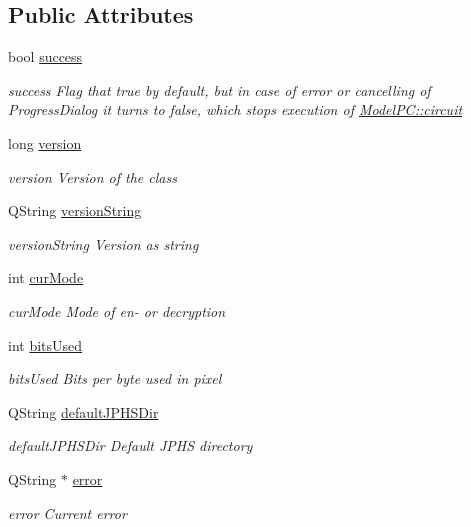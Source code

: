 \subsection*{Public Attributes}
\begin{DoxyCompactItemize}
\item 
bool \mbox{\hyperlink{class_model_p_c_a945ffbbc44a832b953c191debd448f4c}{success}}
\begin{DoxyCompactList}\small\item\em success Flag that true by default, but in case of error or cancelling of Progress\+Dialog it turns to false, which stops execution of \mbox{\hyperlink{class_model_p_c_a1d0091062a0c836b283ec2f67411623b}{Model\+P\+C\+::circuit}} \end{DoxyCompactList}\item 
long \mbox{\hyperlink{class_model_p_c_a5af48ab89e19be42a94c34ba00249401}{version}}
\begin{DoxyCompactList}\small\item\em version Version of the class \end{DoxyCompactList}\item 
Q\+String \mbox{\hyperlink{class_model_p_c_a5f426725ccf7eefd3c77ea8c720264c9}{version\+String}}
\begin{DoxyCompactList}\small\item\em version\+String Version as string \end{DoxyCompactList}\item 
int \mbox{\hyperlink{class_model_p_c_ad74974ac236182c1d6d2cf0729fac3dd}{cur\+Mode}}
\begin{DoxyCompactList}\small\item\em cur\+Mode Mode of en-\/ or decryption \end{DoxyCompactList}\item 
int \mbox{\hyperlink{class_model_p_c_a655deb6a8afa94c7f4aadb3056989038}{bits\+Used}}
\begin{DoxyCompactList}\small\item\em bits\+Used Bits per byte used in pixel \end{DoxyCompactList}\item 
Q\+String \mbox{\hyperlink{class_model_p_c_abd038306f14f22fb885a1697c96d6335}{default\+J\+P\+H\+S\+Dir}}
\begin{DoxyCompactList}\small\item\em default\+J\+P\+H\+S\+Dir Default J\+P\+HS directory \end{DoxyCompactList}\item 
Q\+String $\ast$ \mbox{\hyperlink{class_model_p_c_a4e5a9c0ca1f06fe5bc478b6bf248c37c}{error}}
\begin{DoxyCompactList}\small\item\em error Current error \end{DoxyCompactList}\end{DoxyCompactItemize}
